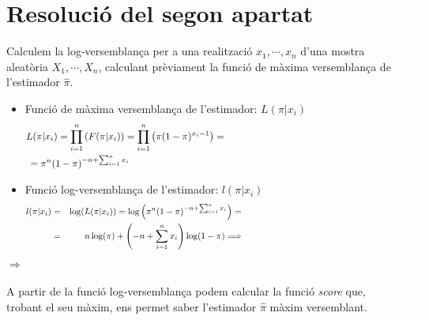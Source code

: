 \documentclass[12pt]{article}
\begin{document}
\section{Resolució del segon apartat}
Calculem la log-versemblança per a una realització $x_1,\cdots,x_n$ d'una mostra aleatòria $X_1,\cdots,X_n$, calculant prèviament la funció de màxima versemblança de l'estimador $\hat{\pi}$.
\begin{itemize}
\item Funció de màxima versemblança de l'estimador: $L(\pi|x_i)$
\begin{multline*}
L(\pi|x_i) = \prod_{i=1}^n\left( F(\pi|x_i) \right) = \prod_{i=1}^n\left( \pi(1-\pi)^{x_i-1} \right) = \textcolor{white}{qqqqqqqqqqqqqqqqqqqqqqqqqqqqqqqqqqqqqqqqqq} \\
= \pi^n (1-\pi)^{-n + \sum_{i=1}^n x_i} \textcolor{white}{qqqqqqqqqqqqqqqqqqqqqqqqqqqqqqqqqqqqqqqqqqqqqqqqqqqqqqqqqqqqqq}
\end{multline*}
\item Funció log-versemblança de l'estimador: $l(\pi|x_i)$
\begin{align*}
l(\pi|x_i) & = & \log ( L(\pi|x_i) ) = \log \left( \pi^n (1-\pi)^{-n + \sum_{i=1}^n x_i} \right) = \textcolor{white}{qqqqqqqqqqqqqqqqqqqqqqqqqqqqqqqqqqqqqqqqqq} \\
& = & n\log(\pi)+ \left(-n + \sum_{i=1}^n x_i\right)\log(1-\pi)\Longrightarrow \textcolor{white}{qqqqqqqqqqqqqqqqqqqqqqqqqqqqqqqqqqqqqqqqqq}
\end{align*}
\end{itemize}
$\Longrightarrow$ \\\\
A partir de la funció log-versemblança podem calcular la funció \textit{score} que, trobant el seu màxim, ens permet saber l'estimador $\hat{\pi}$ màxim versemblant.
\end{document}

